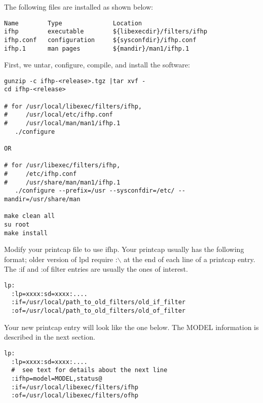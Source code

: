 \documentclass[a4paper]{article}
\begin{document}
The following files are installed as shown below:
\begin{tscreen}
\begin{verbatim}
Name        Type              Location
ifhp        executable        ${libexecdir}/filters/ifhp
ifhp.conf   configuration     ${sysconfdir}/ifhp.conf
ifhp.1      man pages         ${mandir}/man1/ifhp.1
\end{verbatim}
\end{tscreen}


First,  we untar,  configure,  compile, and install the software:
\begin{tscreen}
\begin{verbatim}
gunzip -c ifhp-<release>.tgz |tar xvf -
cd ifhp-<release>

# for /usr/local/libexec/filters/ifhp,
#     /usr/local/etc/ifhp.conf
#     /usr/local/man/man1/ifhp.1
   ./configure
  
OR

# for /usr/libexec/filters/ifhp,
#     /etc/ifhp.conf
#     /usr/share/man/man1/ifhp.1
   ./configure --prefix=/usr --sysconfdir=/etc/ --mandir=/usr/share/man

make clean all
su root
make install
\end{verbatim}
\end{tscreen}


Modify your printcap file to use {\ttfamily ifhp}.
Your printcap usually has the following format;
older version of {\ttfamily lpd} require {\ttfamily :$\backslash$} at the end of each
line of a printcap entry.
The {\ttfamily :if} and {\ttfamily :of} filter entries are usually the ones of interest.
\begin{tscreen}
\begin{verbatim}
lp:
  :lp=xxxx:sd=xxxx:....
  :if=/usr/local/path_to_old_filters/old_if_filter
  :of=/usr/local/path_to_old_filters/old_of_filter
\end{verbatim}
\end{tscreen}


Your new printcap entry will look like the one below.
The {\ttfamily MODEL} information is described in the next section.
\begin{tscreen}
\begin{verbatim}
lp:
  :lp=xxxx:sd=xxxx:....
  #  see text for details about the next line
  :ifhp=model=MODEL,status@
  :if=/usr/local/libexec/filters/ifhp
  :of=/usr/local/libexec/filters/ofhp
\end{verbatim}
\end{tscreen}
\end{document}
